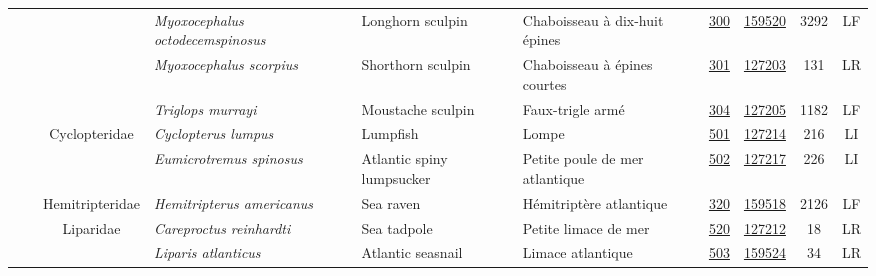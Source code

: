 \documentclass[12pt]{article}\usepackage[]{graphicx}\usepackage[]{color}
\begin{document}
\begin{landscapepage}
\begin{longtable}[t]{ccc>{\centering\arraybackslash}p{3cm}>{\centering\arraybackslash}p{3cm}>{\centering\arraybackslash}p{3cm}>{}c>{}ccc}
\hspace{1em}\hspace{1em} &  &  & \em{Myoxocephalus octodecemspinosus} & Longhorn sculpin & Chaboisseau à dix-huit épines & \href{#sec:300}{300} & \href{http://www.marinespecies.org/aphia.php?p=taxdetails&id=159520}{159520} & 3292 & LF\\
\hspace{1em}\hspace{1em} &  &  & \em{Myoxocephalus scorpius} & Shorthorn sculpin & Chaboisseau à épines courtes & \href{#sec:301}{301} & \href{http://www.marinespecies.org/aphia.php?p=taxdetails&id=127203}{127203} & 131 & LR\\
\hspace{1em}\hspace{1em} &  &  & \em{Triglops murrayi} & Moustache sculpin & Faux-trigle armé & \href{#sec:304}{304} & \href{http://www.marinespecies.org/aphia.php?p=taxdetails&id=127205}{127205} & 1182 & LF\\
\hspace{1em}\hspace{1em} &  & Cyclopteridae & \em{Cyclopterus lumpus} & Lumpfish & Lompe & \href{#sec:501}{501} & \href{http://www.marinespecies.org/aphia.php?p=taxdetails&id=127214}{127214} & 216 & LI\\
\hspace{1em}\hspace{1em} &  &  & \em{Eumicrotremus spinosus} & Atlantic spiny lumpsucker & Petite poule de mer atlantique & \href{#sec:502}{502} & \href{http://www.marinespecies.org/aphia.php?p=taxdetails&id=127217}{127217} & 226 & LI\\
\hspace{1em}\hspace{1em} &  & Hemitripteridae & \em{Hemitripterus americanus} & Sea raven & Hémitriptère atlantique & \href{#sec:320}{320} & \href{http://www.marinespecies.org/aphia.php?p=taxdetails&id=159518}{159518} & 2126 & LF\\
\hspace{1em}\hspace{1em} &  & Liparidae & \em{Careproctus reinhardti} & Sea tadpole & Petite limace de mer & \href{#sec:520}{520} & \href{http://www.marinespecies.org/aphia.php?p=taxdetails&id=127212}{127212} & 18 & LR\\
\hspace{1em}\hspace{1em} &  &  & \em{Liparis atlanticus} & Atlantic seasnail & Limace atlantique & \href{#sec:503}{503} & \href{http://www.marinespecies.org/aphia.php?p=taxdetails&id=159524}{159524} & 34 & LR\\

\end{longtable}
\end{landscapepage}
\end{document}
